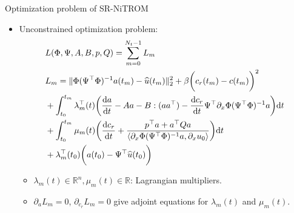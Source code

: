 \documentclass[presentation]{beamer}
\begin{document}
\begin{frame}[label={sec:orga37fe8e}]{Optimization problem of SR-NiTROM}
\begin{itemize}[<+->]
\item Unconstrained optimization problem:
\begin{align}
    & L(\Phi, \Psi, A, B, p, Q) = \sum_{m = 0}^{N_{t} - 1} L_{m}\notag\\
    & L_{m} = \|\Phi(\Psi^{\top}\Phi)^{-1}a(t_{m}) - \widehat{u}(t_{m})\|_{2}^{2} + \beta\bigg(c_{r}(t_{m}) - c(t_{m})\bigg)^{2}\notag\\
    &+ \int_{t_{0}}^{t_{m}}\lambda_{m}^{\top}(t)\bigg(\frac{\mathrm{d}a}{\mathrm{d}t} - Aa - B:(aa^{\top}) - \frac{\mathrm{d}c_{r}}{\mathrm{d}t}\Psi^{\top}\partial_{x}\Phi(\Psi^{\top}\Phi)^{-1}a\bigg)\mathrm{d}t\notag\\
    &+ \int_{t_{0}}^{t_{m}}\mu_{m}(t)\bigg(\frac{\mathrm{d}c_{r}}{\mathrm{d}t} + \frac{p^{\top}a + a^{\top}Qa}{\langle\partial_{x}\Phi(\Psi^{\top}\Phi)^{-1}a, \partial_{x}u_{0}\rangle}\bigg)\mathrm{d}t\notag\\
    &+ \lambda_{m}^{\top}(t_{0})\bigg(a(t_{0}) - \Psi^{\top}\widehat{u}(t_{0})\bigg)
\end{align}
\begin{itemize}
\item \(\lambda_{m}(t)\in\mathbb{R}^{n}, \mu_{m}(t)\in\mathbb{R}\): Lagrangian multipliers.
\item \(\partial_{a}L_{m} = 0\), \(\partial_{c_{r}}L_{m} = 0\) give adjoint equations for \(\lambda_{m}(t)\) and \(\mu_{m}(t)\).
\end{itemize}
\end{itemize}
\end{frame}
\end{document}
